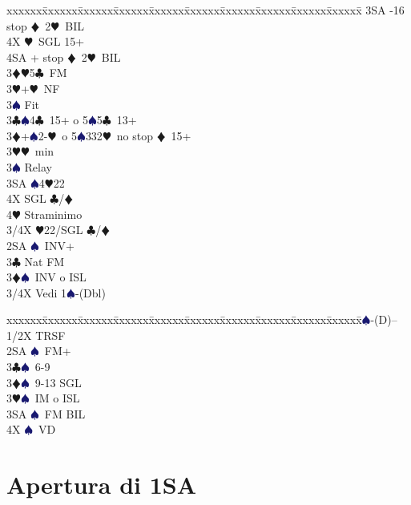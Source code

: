 \documentclass[a4paper,italian]{article}
\newcommand{\BC}{\textcolor{OliveGreen}{$\clubsuit$}}
\newcommand{\BD}{\textcolor{RedOrange}{$\vardiamondsuit$}}
\newcommand{\BH}{\textcolor{Red2}{$\varheartsuit${}}}
\newcommand{\BS}{\textcolor{MidnightBlue}{$\spadesuit${}}}
\newenvironment{bidtable}
{\begin{tabbing}

    xxxxxx\=xxxxxx\=xxxxxx\=xxxxxx\=xxxxxx\=xxxxxx\=xxxxxx\=xxxxxx\=xxxxxx\=xxxxxx\=\kill}
{\end{tabbing} }%
\begin{document}
\begin{multicols}{2}
\begin{bidtable}
        3SA -16 stop \BD\ 2\BH\ BIL\\
        4X \BH\ SGL 15+\\
        4SA + stop \BD\ 2\BH\ BIL\-\\
        3\BD {}\BH 5\BC\ FM\\
        3\BH {}+\BH\ NF\\
        3\BS \> Fit\-\\
        3\BC {}\BS 4\BC\ 15+ o 5\BS 5\BC\ 13+\\
        3\BD {}+\BS2-\BH\ o 5\BS 332\BH\ no stop \BD\ 15+\\
        3\BH {}\BH\ min\+\\
        3\BS \> Relay\+\\
        3SA \BS 4\BH 22\\
        4X \> SGL \BC /\BD \\
        4\BH \> Straminimo\-\-\\
        3/4X \BH 22/SGL \BC /\BD \-\\
        2SA \BS\ INV+\\
        3\BC\> Nat FM\\
        3\BD{}\BS\ INV o ISL\\
        3/4X \> Vedi 1\BS -(Dbl)\-
    \end{bidtable}
    \columnbreak
    \begin{bidtable}
        1\BS-(D)--\+\\
        1/2X \> TRSF\\
        2SA \BS\ FM+\\
        3\BC {}\BS\ 6-9\\
        3\BD {}\BS\ 9-13 SGL\\
        3\BH {}\BS\ IM o ISL\\
        3SA \BS\ FM BIL\\
        4X \BS\ VD\-
    \end{bidtable}
    \vfill\null
\end{multicols}

\newpage

\section{Apertura di 1SA}
\end{document}
